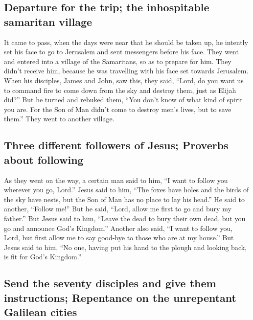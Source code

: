\hypertarget{departure-for-the-trip-the-inhospitable-samaritan-village}{%
\subsection{Departure for the trip; the inhospitable samaritan
village}\label{departure-for-the-trip-the-inhospitable-samaritan-village}}

 It came to pass, when the days were near that he should
be taken up, he intently set his face to go to Jerusalem 
and sent messengers before his face. They went and entered into a
village of the Samaritans, so as to prepare for him. 
They didn't receive him, because he was travelling with his face set
towards Jerusalem.  When his disciples, James and John,
saw this, they said, ``Lord, do you want us to command fire to come down
from the sky and destroy them, just as Elijah did?''  But
he turned and rebuked them, ``You don't know of what kind of spirit you
are.  For the Son of Man didn't come to destroy men's
lives, but to save them.'' They went to another village.

\hypertarget{three-different-followers-of-jesus-proverbs-about-following}{%
\subsection{Three different followers of Jesus; Proverbs about
following}\label{three-different-followers-of-jesus-proverbs-about-following}}

 As they went on the way, a certain man said to him, ``I
want to follow you wherever you go, Lord.''  Jesus said
to him, ``The foxes have holes and the birds of the sky have nests, but
the Son of Man has no place to lay his head.''  He said
to another, ``Follow me!'' But he said, ``Lord, allow me first to go and
bury my father.''  But Jesus said to him, ``Leave the
dead to bury their own dead, but you go and announce God's Kingdom.''
 Another also said, ``I want to follow you, Lord, but
first allow me to say good-bye to those who are at my house.''
 But Jesus said to him, ``No one, having put his hand to
the plough and looking back, is fit for God's Kingdom.''

\hypertarget{send-the-seventy-disciples-and-give-them-instructions-repentance-on-the-unrepentant-galilean-cities}{%
\subsection{Send the seventy disciples and give them instructions;
Repentance on the unrepentant Galilean
cities}\label{send-the-seventy-disciples-and-give-them-instructions-repentance-on-the-unrepentant-galilean-cities}}

